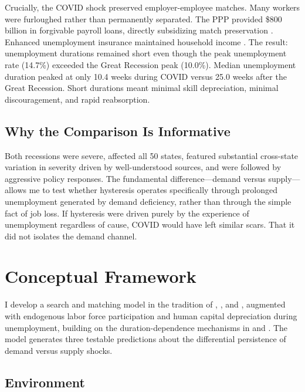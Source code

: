 \documentclass[12pt]{article}
\begin{document}
Crucially, the COVID shock preserved employer-employee matches. Many workers were furloughed rather than permanently separated. The PPP provided \$800 billion in forgivable payroll loans, directly subsidizing match preservation \citep{autor2022paycheck}. Enhanced unemployment insurance maintained household income \citep{ganong2020us}. The result: unemployment durations remained short even though the peak unemployment rate (14.7\%) exceeded the Great Recession peak (10.0\%). Median unemployment duration peaked at only 10.4 weeks during COVID versus 25.0 weeks after the Great Recession. Short durations meant minimal skill depreciation, minimal discouragement, and rapid reabsorption.

\subsection{Why the Comparison Is Informative}

Both recessions were severe, affected all 50 states, featured substantial cross-state variation in severity driven by well-understood sources, and were followed by aggressive policy responses. The fundamental difference---demand versus supply---allows me to test whether hysteresis operates specifically through prolonged unemployment generated by demand deficiency, rather than through the simple fact of job loss. If hysteresis were driven purely by the experience of unemployment regardless of cause, COVID would have left similar scars. That it did not isolates the demand channel.


\section{Conceptual Framework}
\label{sec:framework}

I develop a search and matching model in the tradition of \citet{diamond1982aggregate}, \citet{mortensen1994job}, and \citet{pissarides1985short}, augmented with endogenous labor force participation and human capital depreciation during unemployment, building on the duration-dependence mechanisms in \citet{pissarides1992loss} and \citet{gertler2009unemployment}. The model generates three testable predictions about the differential persistence of demand versus supply shocks.

\subsection{Environment}
\end{document}
